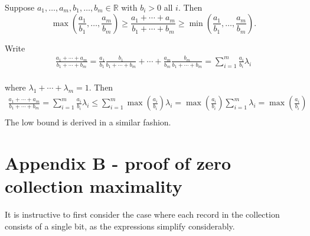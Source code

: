 \documentclass[11pt]{article}
\newcommand{\R}{\mathbb{R}}
\begin{document}
\begin{lem} \label{lem:rsbound}
Suppose $a_1,\dots,a_m,b_1,\dots,b_m \in \R$ with $b_i > 0$ all $i$.
Then 
\[ \max\left(\frac{a_1}{b_1},\dots,\frac{a_m}{b_m}\right) \geq  \frac{a_1 + \cdots + a_m}{b_1 + \cdots + b_m} \geq \min \left(\frac{a_1}{b_1},\dots,\frac{a_m}{b_m}\right). \]
\end{lem}
\begin{pf}
Write
 \begin{align*}
  \frac{a_1 + \cdots + a_m}{b_1 + \cdots + b_m}
= \frac{a_1}{b_1}\frac{b_1}{b_1+\cdots+b_m} +
\cdots + \frac{a_m}{b_m}\frac{b_m}{b_1+\cdots+b_m} = \sum_{i=1}^m \frac{a_i}{b_i} \lambda_i  \\ 
\end{align*}

where $\lambda_1 + \cdots + \lambda_m = 1$.  Then
 \begin{align*}
  \frac{a_1 + \cdots + a_m}{b_1 + \cdots + b_m} = \sum_{i=1}^m \frac{a_i}{b_i} \lambda_i  \leq  \sum_{i=1}^m \max \left ( \frac{a_i}{b_i} \right ) \lambda_i  = \max \left ( \frac{a_i}{b_i} \right ) \sum_{i=1}^m \lambda_i = \max \left ( \frac{a_i}{b_i} \right ) \\ 
\end{align*}
The low bound is derived in a similar fashion. 
\end{pf}


\section{Appendix B - proof of zero collection maximality}

It is instructive to first consider the case where each record in the collection consists of a single bit, as the expressions simplify considerably.
\end{document}
